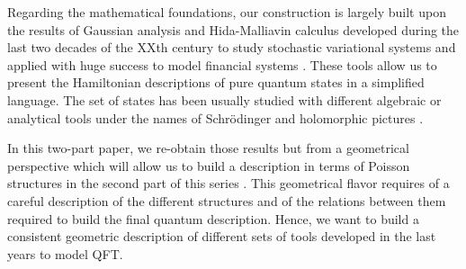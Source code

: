 \documentclass{elsarticle}%
\begin{document}
Regarding the mathematical foundations, our construction is largely built upon the results of Gaussian analysis and Hida-Malliavin calculus developed during the last two decades of the XXth century to study stochastic variational systems and applied with huge success to model financial systems \cite{hidaBrownianMotion1980,hidaWhiteNoise1993,kuoWhiteNoise1996,obataWhiteNoise1994, huAnalysisGaussian2016,nunnoMalliavinCalculus2009,kondratievGeneralizedFunctionals1996, westerkampRecentResults2003}. These tools allow us to present the Hamiltonian descriptions of pure quantum states in a simplified language. The set of states has been usually studied with different algebraic or analytical tools under the names of  Schrödinger \cite{corichiSchrodingerFock2004, longSchrodingerWave1998,longSchrodingerWave1996, hofmannClassicalQuantum2015,hofmannNonGaussianGroundstate2017,hofmannQuantumComplete2019,eglseerQuantumPopulations2021,agulloUnitarityUltraviolet2015,kozhikkalBogoliubovTransformation2023} and holomorphic pictures 
\cite{oecklSchrodingerRepresentation2012,oecklHolomorphicQuantization2012,oecklAffineHolomorphic2012}. 


In this two-part paper, we re-obtain those results but from a geometrical perspective which will allow us to build a description in terms of Poisson structures in the second part of this series  \cite{alonsoGeometricFlavours2024}.
  This geometrical flavor requires of a careful description of the different structures and of the relations between them required to build the final quantum description.  Hence, we want to build a consistent geometric description of  different sets of tools developed in the last years to model QFT. 
\end{document}
